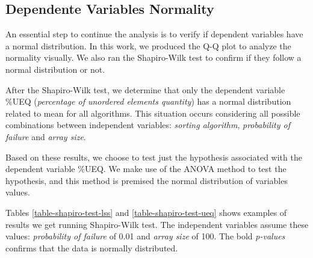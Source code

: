\subsection{Dependente Variables Normality}

An essential step to continue the analysis is to verify if dependent variables have a normal distribution. In this work, we produced the Q-Q plot to analyze the normality visually. We also ran the Shapiro-Wilk \cite{shapiro1965analysis} test to confirm if they follow a normal distribution or not.

After the Shapiro-Wilk test, we determine that only the dependent variable \%UEQ (\textit{percentage of unordered elements quantity}) has a normal distribution related to mean for all algorithms. This situation occurs considering all possible combinations between independent variables: \textit{sorting algorithm}, \textit{probability of failure} and \textit{array size}.

Based on these results, we choose to test just the hypothesis associated with the dependent variable \%UEQ. We make use of the ANOVA method to test the hypothesis, and this method is premised the normal distribution of variables values.

Tables \ref{table-shapiro-test-lss} and \ref{table-shapiro-test-ueq} shows examples of results we get running Shapiro-Wilk test. The independent variables assume these values: \textit{probability of failure} of 0.01 and \textit{array size} of 100. The bold \textit{p-values} confirms that the data is normally distributed.

